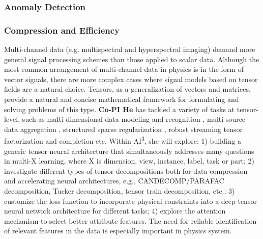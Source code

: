 \subsubsection{Anomaly Detection}

\subsubsection{Compression and Efficiency}





Multi-channel data (e.g. multispectral and hyperspectral imaging) demand more general signal processing schemes than those applied to scalar data. Although the most common arrangement of multi-channel data in physics is in the form of vector signals, there are more complex cases where signal models based on tensor fields are a natural choice.
Tensors, as a generalization of vectors and matrices, provide a natural and concise mathematical framework for formulating and solving problems of this type. \textbf{Co-PI He} has tackled a variety of tasks at tensor-level, such as multi-dimensional data modeling and recognition \cite{he2017kernelized,he2017multi,he2014dusk}, multi-source data aggregation \cite{he2018self,shao2015clustering,lu2018learning,lu2017multilinear}, structured sparse regularization \cite{he2018boosted}, robust streaming tensor factorization and completion \cite{najafi2019outlier} etc. Within AI\textsuperscript{3}, she will explore: 1) building a generic tensor neural architecture that simultaneously addresses many questions in multi-X learning, where X is dimension, view, instance, label, task or part; 2) investigate different types of tensor decompositions both for data compression and accelerating neural architectures, e.g., CANDECOMP/PARAFAC decomposition, Tucker decomposition, tensor train decomposition, etc.; 3) customize the loss function to incorporate physical constraints into a deep tensor neural network architecture for different tasks; 4) explore the attention mechanism to select better attribute features. The need for reliable identification of relevant features in the data is especially important in physics system.



